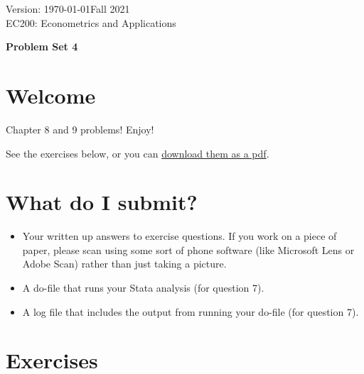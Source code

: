 \documentclass[11pt]{article}
\begin{document}
\thispagestyle{plain}
\singlespacing


Version: \today \hfill Fall 2021\\
EC200: Econometrics and Applications
\begin{center}
\Large{\textbf{Problem Set 4}}\\
\end{center}
\bigskip


\hypertarget{welcome}{%
\section*{Welcome}\label{welcome}}

Chapter 8 and 9 problems! Enjoy!

See the exercises below, or you can \href{https://ec200f21.netlify.app/assignment/04-ps.pdf}{download them as
a pdf}.

\hypertarget{what-do-i-submit}{%
\section*{What do I submit?}\label{what-do-i-submit}}

\begin{itemize}
\item
  Your written up answers to exercise questions. If you work on a piece
  of paper, please scan using some sort of phone software (like
  Microsoft Lens or Adobe Scan) rather than just taking a picture.
\item
  A do-file that runs your Stata analysis (for question 7).
\item
  A log file that includes the output from running your do-file (for
  question 7).
\end{itemize}

\hypertarget{exercises}{%
\section*{Exercises}\label{exercises}}
\end{document}
